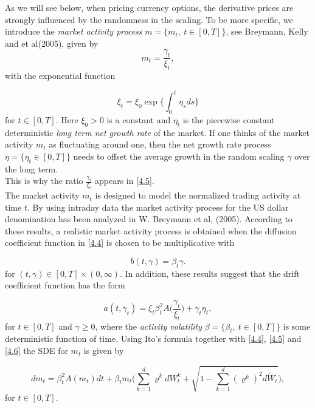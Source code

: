 \documentclass[a4 paper, 12pt]{report}
\theoremstyle{plain}
\begin{document}
\par As we will see below, when pricing currency options, the derivative prices are strongly influenced by the randomness in the scaling. To be more specific, we introduce the \emph{market activity process } $m = \{m_t,~t\in[0,T]\}$, see Breymann, Kelly and et al(2005), given by 
\begin{equation}\label{4.5}
m_t = \frac{\gamma_t}{\xi_t},
\end{equation}
with the exponential function

\begin{equation}\label{4.6}
\xi_t = \xi_0\exp\bigg\{\int_0^t\eta_sds\}
\end{equation}
for $t\in [0,T]$. Here $\xi_0>0$ is a constant and $\eta_t$ is the piecewise constant deterministic \emph{long term net growth rate} of the market. If one thinks of the market activity $m_t$ as fluctuating around one, then the net growth rate process $\eta = \{\eta_t\in[0,T]\}$ needs to offset the average growth in the random scaling $\gamma$ over the long term.\\
This is why the ratio $\frac{\gamma_t}{\xi_t}$ appears in \eqref{4.5}.\\

The market activity $m_t$ is designed to model the normalized trading activity at
time $t$. By using intraday data the market activity process for the US dollar
denomination has been analyzed in W. Breymann et al, (2005). According to
these results, a realistic market activity process is obtained when the diffusion
coefficient function in \eqref{4.4} is chosen to be multiplicative with

\begin{equation}\label{4.7}
b(t,\gamma) = \beta_t\gamma.
\end{equation}
for $(t,\gamma)\in[0,T]\times (0,\infty)$. In addition, these results suggest that the drift coefficient function has the form 

\begin{equation}\label{4.8}
a(t,\gamma_t) = \xi_t\beta_t^2A\bigg(\frac{\gamma_t}{\xi_t}\bigg)+\gamma_t\eta_t,
\end{equation}
for $t\in[0,T]$ and $\gamma\geq 0$, where the \emph{activity volatility} $\beta = \{\beta_t, ~t\in[0,T]\}$ is some deterministic function of time. Using Ito's formula together with \eqref{4.4}, \eqref{4.5} and \eqref{4.6} the  SDE for $m_t$ is given by

$$
dm_t = \beta_t^2 A(m_t)dt+\beta_tm_t\bigg(\sum_{k = 1}^d\varrho^kdW_t^k+\sqrt{1-\sum_{k = 1}^d(\varrho^k)^2d\tilde{W}_t}\bigg),
$$
for $t\in[0,T]$.\\
\end{document}
